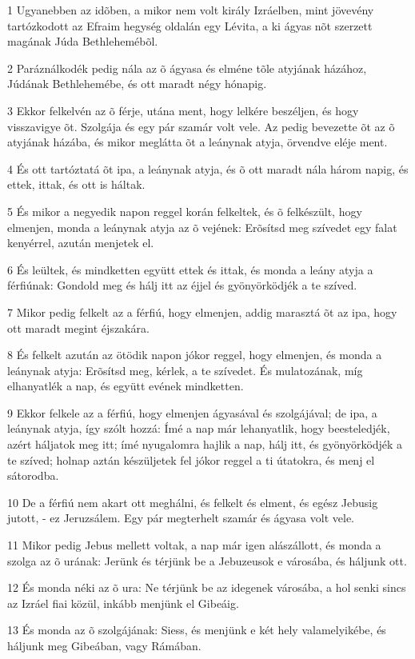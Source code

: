 \par 1 Ugyanebben az idõben, a mikor nem volt király Izráelben, mint jövevény tartózkodott az Efraim hegység oldalán egy Lévita, a ki ágyas nõt szerzett magának Júda Bethlehemébõl.
\par 2 Paráználkodék pedig nála az õ ágyasa és elméne tõle atyjának házához, Júdának Bethlehemébe, és ott maradt négy hónapig.
\par 3 Ekkor felkelvén az õ férje, utána ment, hogy lelkére beszéljen, és hogy visszavigye õt. Szolgája és egy pár szamár volt vele. Az pedig bevezette õt az õ atyjának házába, és mikor meglátta õt a leánynak atyja, örvendve eléje ment.
\par 4 És ott tartóztatá õt ipa, a leánynak atyja, és õ ott maradt nála három napig, és ettek, ittak, és ott is háltak.
\par 5 És mikor a negyedik napon reggel korán felkeltek, és õ felkészült, hogy elmenjen, monda a leánynak atyja az õ vejének: Erõsítsd meg szívedet egy falat kenyérrel, azután menjetek el.
\par 6 És leültek, és mindketten együtt ettek és ittak, és monda a leány atyja a férfiúnak: Gondold meg és hálj itt az éjjel és gyönyörködjék a te szíved.
\par 7 Mikor pedig felkelt az a férfiú, hogy elmenjen, addig marasztá õt az ipa, hogy ott maradt megint éjszakára.
\par 8 És felkelt azután az ötödik napon jókor reggel, hogy elmenjen, és monda a leánynak atyja: Erõsítsd meg, kérlek, a te szívedet. És mulatozának, míg elhanyatlék a nap, és együtt evének mindketten.
\par 9 Ekkor felkele az a férfiú, hogy elmenjen ágyasával és szolgájával; de ipa, a leánynak atyja, így szólt hozzá: Ímé a nap már lehanyatlik, hogy beesteledjék, azért háljatok meg itt; ímé nyugalomra hajlik a nap, hálj itt, és gyönyörködjék a te szíved; holnap aztán készüljetek fel jókor reggel a ti útatokra, és menj el sátorodba.
\par 10 De a férfiú nem akart ott meghálni, és felkelt és elment, és egész Jebusig jutott, - ez Jeruzsálem. Egy pár megterhelt szamár és ágyasa volt vele.
\par 11 Mikor pedig Jebus mellett voltak, a nap már igen alászállott, és monda a szolga az õ urának: Jerünk és térjünk be a Jebuzeusok e városába, és háljunk ott.
\par 12 És monda néki az õ ura: Ne térjünk be az idegenek városába, a hol senki sincs az Izráel fiai közül, inkább menjünk el Gibeáig.
\par 13 És monda az õ szolgájának: Siess, és menjünk e két hely valamelyikébe, és háljunk meg Gibeában, vagy Rámában.
